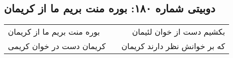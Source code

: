 \begin{center}
\section*{دوبیتی شماره ۱۸۰: بوره منت بریم ما از کریمان}
\label{sec:180}
\begin{longtable}{l p{0.5cm} r}
بوره منت بریم ما از کریمان
&&
بکشیم دست از خوان لئیمان
\\
کریمان دست در خوان کریمی
&&
که بر خوانش نظر دارند کریمان
\\
\end{longtable}
\end{center}
